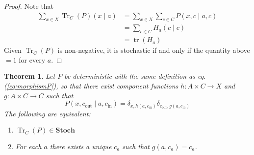 \documentclass[10pt, a4paper]{article}
\newcommand{\Tr}[0]{\operatorname{Tr}}
\newcommand{\tr}[0]{\operatorname{tr}}
\newtheorem{theorem}{Theorem}
\begin{document}
\begin{proof}
    Note that 
    \begin{align*} 
        \sum_{x \in X} \Tr_C(P) (x \mid a) &= \sum_{x \in X} \sum_{c \in C} P(x, c \mid a, c) \\
        &= \sum_{c \in C } H_a (c \mid c) \\
        &= \tr (H_a)
    \end{align*} 
    Given $\Tr_C(P)$ is non-negative, it is stochastic if and only if the quantity above $=1$ for every $a$. 

\end{proof}

\begin{theorem}
    Let $P$ be deterministic with the same definition as eq. (\ref{eq:morphismP}), so that there exist component functions $h: A \times C \to X$ and $g: A \times C \to C$ such that $$ P(x, c_{\mathrm{out}} \mid a, c_{\mathrm{in}}) = \delta_{x, h(a, c_{\mathrm{in}})} \delta_{c_{\mathrm{out}}, g(a, c_{\mathrm{in}})} $$ The following are equivalent:
    \begin{enumerate}
        \item $\Tr_C(P) \in \mathbf{Stoch}$
        \item For each $a$ there exists a unique $c_a$ such that $g(a, c_a) = c_a$.
    \end{enumerate}
\end{theorem}
\end{document}
